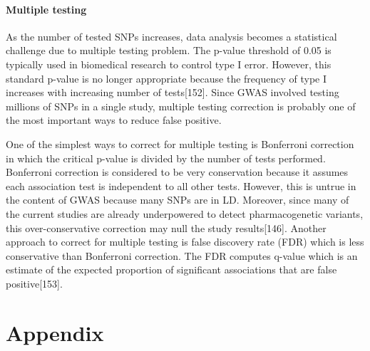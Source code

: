 \documentclass[12pt]{report}
\begin{document}
			\subsubsection{Multiple testing}
				As the number of tested SNPs increases, data analysis becomes a statistical challenge due to multiple testing problem. 
				The p-value threshold of 0.05 is typically used in biomedical research to control type I error.
				However, this standard p-value is no longer appropriate because the frequency of type I increases with increasing number of tests[152]. 
				Since GWAS involved testing millions of SNPs in a single study, multiple testing correction is probably one of the most important ways to reduce false positive. 
				
				One of the simplest ways to correct for multiple testing is Bonferroni correction in which the critical p-value is divided by the number of tests performed. 
				Bonferroni correction is considered to be very conservation because it assumes each association test is independent to all other tests. 
				However, this is untrue in the content of GWAS because many SNPs are in LD.
				Moreover, since many of the current studies are already underpowered to detect pharmacogenetic variants, this over-conservative correction may null the study results[146]. 
				Another approach to correct for multiple testing is false discovery rate (FDR) which is less conservative than Bonferroni correction. 
				The FDR computes q-value which is an estimate of the expected proportion of significant associations that are false positive[153].  
	
				
						
						
				
	\chapter*{Appendix}
\end{document}
